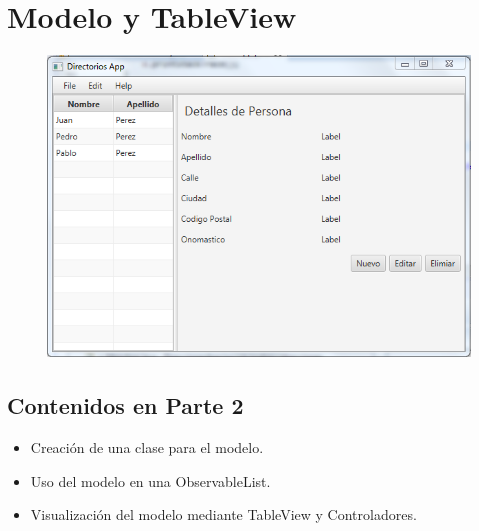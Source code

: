 \chapter{Modelo y TableView}
\begin{figure}[H]
	\includegraphics[width=12cm]{img/terceraParte}
\end{figure}
\section{Contenidos en Parte 2}
\begin{itemize}
	\item Creación de una clase para el modelo.
	\item Uso del modelo en una ObservableList.
	\item Visualización del modelo mediante TableView y Controladores.
\end{itemize}

